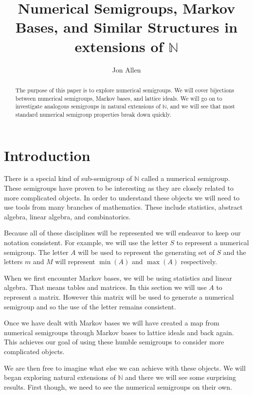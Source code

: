 \documentclass[11pt]{amsart}
\theoremstyle{plain}
\theoremstyle{definition}
\begin{document}
\title{Numerical Semigroups, Markov Bases, and Similar Structures in extensions of $\mathbb{N}$}
\author{Jon Allen}
\begin{abstract}
The purpose of this paper is to explore numerical semigroups. We will cover bijections between numerical semigroups, Markov bases, and lattice ideals. We will go on to investigate analogous semigroups in natural extensions of $\mathbb{N}$, and we will see that most standard numerical semigroup properties break down quickly.
\end{abstract}
\maketitle
\section{Introduction}
There is a special kind of sub-semigroup of $\mathbb{N}$ called a numerical semigroup. These semigroups have proven to be interesting as they are closely related to more complicated objects. In order to understand these objects we will need to use tools from many  branches of mathematics. These include statistics, abstract algebra, linear algebra, and combinatorics.

Because all of these disciplines will be represented we will endeavor to keep our notation consistent. For example, we will use the letter $S$ to represent a numerical semigroup. The letter $A$ will be used to represent the generating set of $S$ and the letters $m$ and $M$ will represent $\min(A)$ and $\max(A)$ respectively.

When we first encounter Markov bases, we will be using statistics and linear algebra. That means tables and matrices. In this section we will use $A$ to represent a matrix. However this matrix will be used to generate a numerical semigroup and so the use of the letter remains consistent.

Once we have dealt with Markov bases we will have created a map from numerical semigroups through Markov bases to lattice ideals and back again. This achieves our goal of using these humble semigroups to consider more complicated objects.

We are then free to imagine what else we can achieve with these objects. We will began exploring natural extensions of $\mathbb{N}$ and there we will see some surprising results. First though, we need to see the numerical semigroups on their own.
\end{document}
